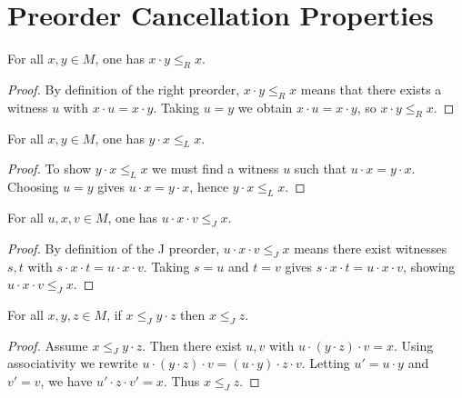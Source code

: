 \section{Preorder Cancellation Properties}

\begin{lemma}
\label{lem:RRel-mul_right_self}
For all \(x,y\in M\), one has \(x \cdot y \le_R x\).
\leanok
{}
\end{lemma}
\begin{proof}
\leanok
By definition of the right preorder, \(x \cdot y \le_R x\) means that there exists a witness \(u\) with \(x \cdot u = x \cdot y\).  Taking \(u = y\) we obtain \(x \cdot u = x \cdot y\), so \(x \cdot y \le_R x\).
\end{proof}


\begin{lemma}
\label{lem:LRel-mul_left_self}
For all \(x,y\in M\), one has \(y \cdot x \le_L x\).
\leanok
{}
\end{lemma}
\begin{proof}
\leanok
To show \(y \cdot x \le_L x\) we must find a witness \(u\) such that \(u \cdot x = y \cdot x\).  Choosing \(u = y\) gives \(u \cdot x = y \cdot x\), hence \(y \cdot x \le_L x\).
\end{proof}

\begin{lemma}
\label{lem:JRel-mul_sandwich_self}
For all \(u,x,v \in M\), one has \(u \cdot x \cdot v \le_J x\).
\leanok
{}
\end{lemma}
\begin{proof}
\leanok
By definition of the J preorder, \(u \cdot x \cdot v \le_J x\) means there exist witnesses \(s,t\) with \(s \cdot x \cdot t = u \cdot x \cdot v\).  Taking \(s=u\) and \(t=v\) gives \(s \cdot x \cdot t = u \cdot x \cdot v\), showing \(u \cdot x \cdot v \le_J x\).
\end{proof}

\begin{lemma}
\label{lem:JRel-left_cancel}
For all \(x,y,z \in M\), if \(x \le_J y \cdot z\) then \(x \le_J z\).
\leanok
{}
\end{lemma}
\begin{proof}
\leanok
Assume \(x \le_J y \cdot z\).  Then there exist \(u,v\) with \(u \cdot (y \cdot z) \cdot v = x\).  Using associativity we rewrite \(u \cdot (y \cdot z) \cdot v = (u \cdot y) \cdot z \cdot v\).  Letting \(u' = u \cdot y\) and \(v' = v\), we have \(u' \cdot z \cdot v' = x\).  Thus \(x \le_J z\).
\end{proof}

